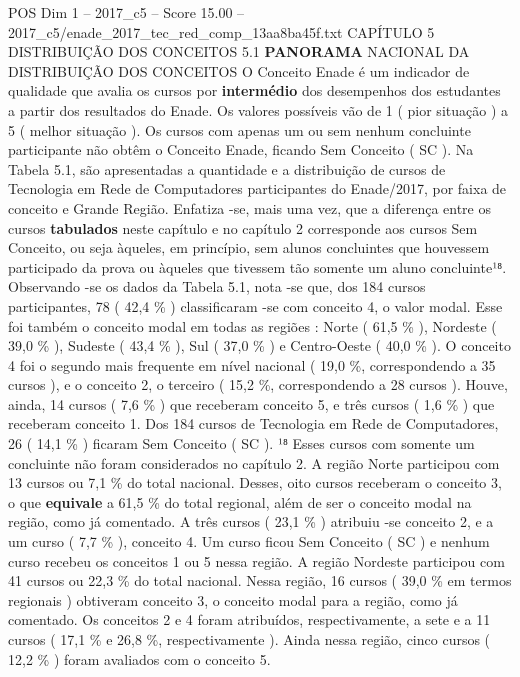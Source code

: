 \begin{textsample}{POS Dim 1 – 2017\_c5 – Score 15.00 – 2017\_c5/enade\_2017\_tec\_red\_comp\_13aa8ba45f.txt}  \label{ex:f1_pos_056}
CAPÍTULO 5 DISTRIBUIÇÃO DOS CONCEITOS 5.1 \textbf{PANORAMA} NACIONAL DA DISTRIBUIÇÃO DOS CONCEITOS O Conceito Enade é um indicador de qualidade que avalia os cursos por \textbf{intermédio} dos desempenhos dos estudantes a partir dos resultados do Enade.
Os valores possíveis vão de 1 ( pior situação ) a 5 ( melhor situação ).
Os cursos com apenas um ou sem nenhum concluinte participante não obtêm o Conceito Enade, ficando Sem Conceito ( SC ).
Na Tabela 5.1, são apresentadas a quantidade e a distribuição de cursos de Tecnologia em Rede de Computadores participantes do Enade/2017, por faixa de conceito e Grande Região.
Enfatiza -se, mais uma vez, que a diferença entre os cursos \textbf{tabulados} neste capítulo e no capítulo 2 corresponde aos cursos Sem Conceito, ou seja àqueles, em princípio, sem alunos concluintes que houvessem participado da prova ou àqueles que tivessem tão somente um aluno concluinte¹⁸.
Observando -se os dados da Tabela 5.1, nota -se que, dos 184 cursos participantes, 78 ( 42,4 \% ) classificaram -se com conceito 4, o valor modal.
Esse foi também o conceito modal em todas as regiões : Norte ( 61,5 \% ), Nordeste ( 39,0 \% ), Sudeste ( 43,4 \% ), Sul ( 37,0 \% ) e Centro-Oeste ( 40,0 \% ).
O conceito 4 foi o segundo mais frequente em nível nacional ( 19,0 \%, correspondendo a 35 cursos ), e o conceito 2, o terceiro ( 15,2 \%, correspondendo a 28 cursos ).
Houve, ainda, 14 cursos ( 7,6 \% ) que receberam conceito 5, e três cursos ( 1,6 \% ) que receberam conceito 1.
Dos 184 cursos de Tecnologia em Rede de Computadores, 26 ( 14,1 \% ) ficaram Sem Conceito ( SC ). ¹⁸ Esses cursos com somente um concluinte não foram considerados no capítulo 2.
A região Norte participou com 13 cursos ou 7,1 \% do total nacional.
Desses, oito cursos receberam o conceito 3, o que \textbf{equivale} a 61,5 \% do total regional, além de ser o conceito modal na região, como já comentado.
A três cursos ( 23,1 \% ) atribuiu -se conceito 2, e a um curso ( 7,7 \% ), conceito 4.
Um curso ficou Sem Conceito ( SC ) e nenhum curso recebeu os conceitos 1 ou 5 nessa região.
A região Nordeste participou com 41 cursos ou 22,3 \% do total nacional.
Nessa região, 16 cursos ( 39,0 \% em termos regionais ) obtiveram conceito 3, o conceito modal para a região, como já comentado.
Os conceitos 2 e 4 foram atribuídos, respectivamente, a sete e a 11 cursos ( 17,1 \% e 26,8 \%, respectivamente ).
Ainda nessa região, cinco cursos ( 12,2 \% ) foram avaliados com o conceito 5.

\end{textsample}
